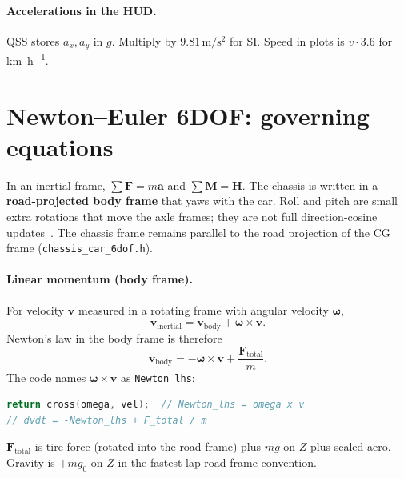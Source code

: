 \documentclass[11pt,letterpaper]{article}
\begin{document}
\paragraph{Accelerations in the HUD.}
QSS stores $a_x,a_y$ in $g$. Multiply by
$9.81\,\si{\metre\per\second\squared}$ for SI. Speed in plots is
$v\cdot 3.6$ for \si{\kilo\metre\per\hour}.

\section{Newton--Euler 6DOF: governing equations}
\label{sec:newton}

In an inertial frame, $\sum\mathbf{F}=m\mathbf{a}$ and
$\sum\mathbf{M}=\dot{\mathbf{H}}$. The chassis is written in a
\textbf{road-projected body frame} that yaws with the car. Roll and
pitch are small extra rotations that move the axle frames; they are
not full direction-cosine updates~\cite{manzanero-fastestlap}. The
chassis frame remains parallel to the road projection of the CG frame
(\texttt{chassis\_car\_6dof.h}).

\paragraph{Linear momentum (body frame).}
For velocity $\mathbf{v}$ measured in a rotating frame with angular
velocity $\boldsymbol{\omega}$,
\begin{equation}
  \dot{\mathbf{v}}_{\mathrm{inertial}}
  = \dot{\mathbf{v}}_{\mathrm{body}} + \boldsymbol{\omega}\times\mathbf{v}.
  \label{eq:transport}
\end{equation}
Newton's law in the body frame is therefore
\begin{equation}
  \dot{\mathbf{v}}_{\mathrm{body}}
  = -\boldsymbol{\omega}\times\mathbf{v} + \frac{\mathbf{F}_{\mathrm{total}}}{m}.
  \label{eq:newton}
\end{equation}
The code names $\boldsymbol{\omega}\times\mathbf{v}$ as \texttt{Newton\_lhs}:

\begin{lstlisting}[language=C++,caption={Transport theorem, \texttt{chassis\_car\_6dof.hpp}.}]
return cross(omega, vel);  // Newton_lhs = omega x v
// dvdt = -Newton_lhs + F_total / m
\end{lstlisting}

$\mathbf{F}_{\mathrm{total}}$ is tire force (rotated into the road
frame) plus $mg$ on $Z$ plus scaled aero. Gravity is $+m g_0$ on $Z$ in
the fastest-lap road-frame convention.
\end{document}
